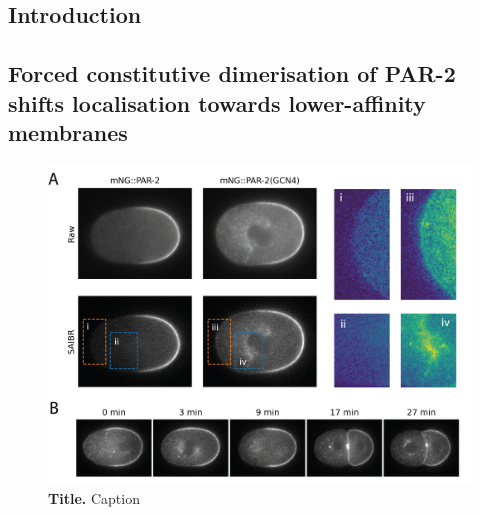 \documentclass[12pt]{"article"}
\newcommand{\mycaption}[2]{\caption[#1]{\textbf{#1.} #2}}
\begin{document}
\subsection{Introduction}

\subsection{Forced constitutive dimerisation of PAR-2 shifts localisation towards lower-affinity membranes}



\begin{figure}[!h]
\includegraphics[scale=1]{gcn4}
\setlength{\abovecaptionskip}{20pt}
\centering
\mycaption{Title}{Caption}
\label{fig:gcn4}
\end{figure}
\end{document}

